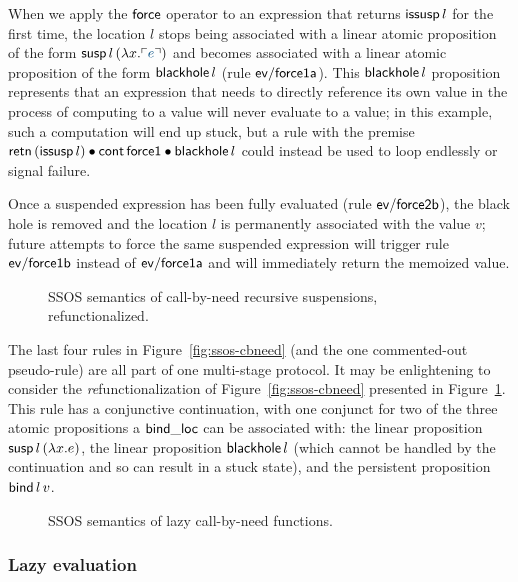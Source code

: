 When we apply the ${\sf force}$ operator to an expression that returns
${\sf issusp}\,l$ for the first time, the location $l$ stops
being associated with a linear atomic proposition of the form ${\sf
  susp}\,l\,(\lambda x.\interp{e})$ and becomes associated with a
linear atomic proposition of the form ${\sf blackhole}\,l$ (rule ${\sf
  ev/force1a}$). This ${\sf blackhole}\,l$ proposition represents that
an expression that needs to directly reference its own value in the
process of computing to a value will never evaluate to a value; in
this example, such a computation will end up stuck, but a rule with the
premise ${\sf retn}\,({\sf issusp}\,l) \mathbin{\bullet} {\sf cont}\,{\sf force1}
\mathbin{\bullet} {\sf blackhole}\,l$ could instead be used to loop endlessly 
or signal failure. 

Once a suspended expression has been fully evaluated (rule ${\sf ev/force2b}$),
the black hole is removed and the location $l$ is permanently associated
with the value $v$; future attempts to force the same suspended
expression will trigger rule ${\sf ev/force1b}$ instead of 
${\sf ev/force1a}$ and will immediately return the memoized value.

\begin{figure}[t]
\caption{SSOS semantics of call-by-need recursive suspensions, refunctionalized.}
\label{fig:ssos-cbneed-refun}
\end{figure}

The last four rules in Figure~\ref{fig:ssos-cbneed} (and the one
commented-out pseudo-rule) are all part of one multi-stage protocol.
It may be enlightening to consider the {\it re}functionalization of
Figure~\ref{fig:ssos-cbneed} presented in
Figure~\ref{fig:ssos-cbneed-refun}. This rule has a conjunctive
continuation, with one conjunct for two of the three atomic propositions a
${\sf bind\_loc}$ can be associated with: the linear proposition
${\sf susp}\,l\,(\lambda x.e)$, the linear proposition 
${\sf blackhole}\,l$ (which cannot be handled by the continuation and 
so can result in a stuck state), and the persistent proposition
${\sf bind}\,l\,v$. 

\begin{figure}
\caption{SSOS semantics of lazy call-by-need functions.}
\label{fig:ssos-by-need}
\end{figure}


\subsubsection{Lazy evaluation}


